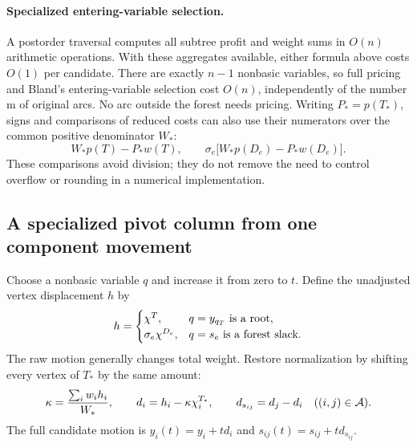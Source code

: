 \paragraph{Specialized entering-variable selection.}
A postorder traversal computes all subtree profit and weight sums in $O(n)$
arithmetic operations. With these aggregates available, either formula above
costs $O(1)$ per candidate. There are exactly $n-1$ nonbasic variables, so full
pricing and Bland's entering-variable selection cost $O(n)$, independently of
the number m of original arcs. No arc outside the forest needs pricing.
Writing $P_*=p(T_*)$, signs and comparisons of reduced costs can also use
their numerators over the common positive denominator $W_*$:
\[
 W_*p(T)-P_*w(T),\qquad
 \sigma_e\bigl[W_*p(D_e)-P_*w(D_e)\bigr].
\]
These comparisons avoid division; they do not remove the need to control
overflow or rounding in a numerical implementation.

\subsection{A specialized pivot column from one component movement}
Choose a nonbasic variable $q$ and increase it from zero to $t$. Define the
unadjusted vertex displacement $h$ by
\begin{equation}\label{eq:h}
 h=\begin{cases}
 \chi^T,&q=y_{q_T}\text{ is a root},\\
 \sigma_e\chi^{D_e},&q=s_e\text{ is a forest slack}.
 \end{cases}
\end{equation}
The raw motion generally changes total weight. Restore normalization by
shifting every vertex of $T_*$ by the same amount:
\begin{equation}\label{eq:direction}
 \kappa=\frac{\sum_i w_i h_i}{W_*},\qquad
 d_i=h_i-\kappa\chi^{T_*}_i,\qquad
 d_{s_{ij}}=d_j-d_i\quad((i,j)\in\mathcal A).
\end{equation}
The full candidate motion is
$y_i(t)=y_i+t d_i$ and $s_{ij}(t)=s_{ij}+t d_{s_{ij}}$.

